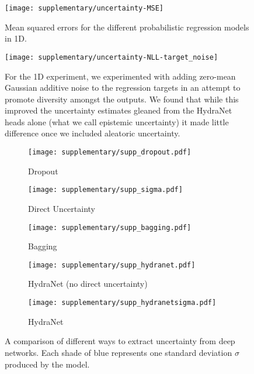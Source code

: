 \begin{figure}
	\centering
	\texttt{[image: supplementary/uncertainty-MSE]}
	\caption{Mean squared errors for the different probabilistic regression models in 1D.}
	\label{fig:1d-mse}
\end{figure}


\begin{figure}
	\centering
	\texttt{[image: supplementary/uncertainty-NLL-target\_noise]}
	\caption{For the 1D experiment, we experimented with adding zero-mean Gaussian additive noise to the regression targets in an attempt to promote diversity amongst the outputs. We found that while this improved the uncertainty estimates gleaned from the HydraNet heads alone (what we call epistemic uncertainty) it made little difference once we included aleatoric uncertainty.}
	\label{fig:1d-target-noise}
\end{figure}


\begin{figure*}[h!]
	\centering
	\begin{subfigure}[]{\textwidth}
		\texttt{[image: supplementary/supp\_dropout.pdf]}
		\caption{Dropout}
		\label{fig:1D_dropout}
	\end{subfigure}
	\hfill
	\begin{subfigure}[]{\textwidth}
		\texttt{[image: supplementary/supp\_sigma.pdf]}
		\caption{Direct Uncertainty}
		\label{fig:1D_direct}
	\end{subfigure}
	\hfill
	\begin{subfigure}[]{\textwidth}
		\texttt{[image: supplementary/supp\_bagging.pdf]}
		\caption{Bagging}
		\label{fig:1D_bagging}
	\end{subfigure}
	\hfill	
	\begin{subfigure}[]{\textwidth}
		\texttt{[image: supplementary/supp\_hydranet.pdf]}
		\caption{HydraNet (no direct uncertainty)}
		\label{fig:1D_hydranet_undirect}
	\end{subfigure}
	\hfill
	\begin{subfigure}[]{\textwidth}
		\texttt{[image: supplementary/supp\_hydranetsigma.pdf]}
		\caption{HydraNet}
		\label{fig:1D_hydranet}
	\end{subfigure}
	\hfill		
	\caption{A comparison of different ways to extract uncertainty from deep networks. Each shade of blue represents one standard deviation $\sigma$ produced by the model.}
	\label{fig:1d_uncertainty}
\end{figure*}

